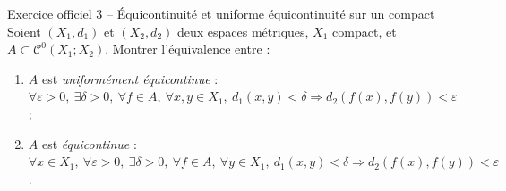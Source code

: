 \documentclass[11pt,a4paper]{article}
\newcommand{\Cz}{\mathcal{C}^0}
\theoremstyle{definition}
\begin{document}
\begin{exo}{Exercice officiel 3 -- Équicontinuité et uniforme équicontinuité sur un compact}
Soient $(X_1,d_1)$ et $(X_2,d_2)$ deux espaces métriques, $X_1$ compact, et $A\subset\Cz(X_1;X_2)$. Montrer l'équivalence entre :
\begin{enumerate}[label=\alph*)]
  \item $A$ est \emph{uniformément équicontinue} : $\forall\varepsilon>0,\ \exists\delta>0,\ \forall f\in A,\ \forall x,y\in X_1,\ d_1(x,y)<\delta\Rightarrow d_2(f(x),f(y))<\varepsilon$ ;
  \item $A$ est \emph{équicontinue} : $\forall x\in X_1,\ \forall\varepsilon>0,\ \exists\delta>0,\ \forall f\in A,\ \forall y\in X_1,\ d_1(x,y)<\delta\Rightarrow d_2(f(x),f(y))<\varepsilon$.
\end{enumerate}
\end{exo}
\end{document}
